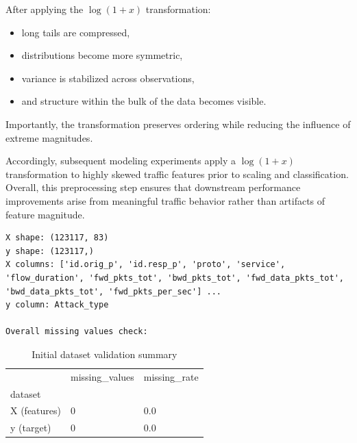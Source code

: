 \documentclass[
  letterpaper,
  DIV=11,
  numbers=noendperiod]{scrartcl}
\providecommand{\tightlist}{%
  \setlength{\itemsep}{0pt}\setlength{\parskip}{0pt}}
\begin{document}
\begin{enumerate}
\begin{itemize}
    After applying the \(\log(1 + x)\) transformation:

    \begin{itemize}
    \tightlist
    \item
      long tails are compressed,
    \item
      distributions become more symmetric,
    \item
      variance is stabilized across observations,
    \item
      and structure within the bulk of the data becomes visible.
    \end{itemize}

    Importantly, the transformation preserves ordering while reducing
    the influence of extreme magnitudes.
  \end{itemize}

  Accordingly, subsequent modeling experiments apply a \(\log(1+x)\)
  transformation to highly skewed traffic features prior to scaling and
  classification. Overall, this preprocessing step ensures that
  downstream performance improvements arise from meaningful traffic
  behavior rather than artifacts of feature magnitude.
\end{enumerate}

\begin{verbatim}
X shape: (123117, 83)
y shape: (123117,)
X columns: ['id.orig_p', 'id.resp_p', 'proto', 'service', 'flow_duration', 'fwd_pkts_tot', 'bwd_pkts_tot', 'fwd_data_pkts_tot', 'bwd_data_pkts_tot', 'fwd_pkts_per_sec'] ...
y column: Attack_type

Overall missing values check:
\end{verbatim}

\begin{longtable}[]{@{}lll@{}}

\caption{\label{tbl-rtiot-validation}Initial dataset validation summary}

\tabularnewline

\toprule\noalign{}
& missing\_values & missing\_rate \\
dataset & & \\
\midrule\noalign{}
\endhead
\bottomrule\noalign{}
\endlastfoot
X (features) & 0 & 0.0 \\
y (target) & 0 & 0.0 \\

\end{longtable}
\end{document}
